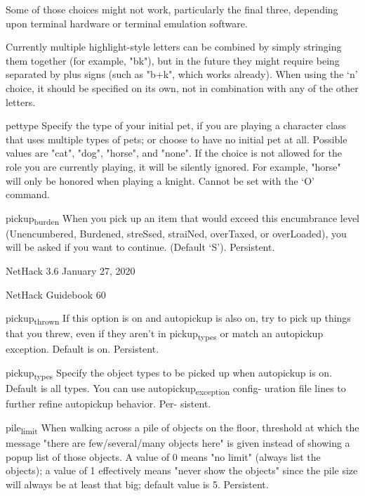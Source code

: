 \documentclass[11pt]{article}
\begin{document}
Some of those choices might not work, particularly the final
three, depending upon terminal hardware or terminal emulation
software.

Currently multiple highlight-style letters can be combined by
simply stringing them together (for example, "bk"), but in the
future they might require being separated by plus signs (such
as "b+k", which works already). When using the `n' choice, it
should be specified on its own, not in combination with any of
the other letters.

pettype
 Specify the type of your initial pet, if you are playing a
 character class that uses multiple types of pets; or choose to
 have no initial pet at all. Possible values are "cat", "dog",
 "horse", and "none". If the choice is not allowed for the role
 you are currently playing, it will be silently ignored. For
 example, "horse" will only be honored when playing a knight.
 Cannot be set with the `O' command.

pickup\textsubscript{burden}
 When you pick up an item that would exceed this encumbrance
 level (Unencumbered, Burdened, streSsed, straiNed, overTaxed,
 or overLoaded), you will be asked if you want to continue.
 (Default `S'). Persistent.


NetHack 3.6                   January 27, 2020





NetHack Guidebook                       60



pickup\textsubscript{thrown}
 If this option is on and autopickup is also on, try to pick up
 things that you threw, even if they aren't in pickup\textsubscript{types} or
 match an autopickup exception. Default is on. Persistent.

pickup\textsubscript{types}
 Specify the object types to be picked up when autopickup is on.
 Default is all types. You can use autopickup\textsubscript{exception} config-
 uration file lines to further refine autopickup behavior. Per-
 sistent.

pile\textsubscript{limit}
 When walking across a pile of objects on the floor, threshold
 at which the message "there are few/several/many objects here"
 is given instead of showing a popup list of those objects. A
 value of 0 means "no limit" (always list the objects); a value
 of 1 effectively means "never show the objects" since the pile
 size will always be at least that big; default value is 5.
 Persistent.
\end{document}
